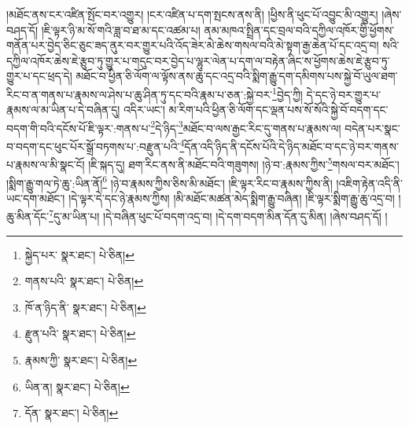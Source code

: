 །མཐོང་ནས་ངར་འཛིན་སྤོང་བར་འགྱུར། །ངར་འཛིན་པ་དག་སྤངས་ནས་ནི། །ཕྱིས་ནི་ཕུང་པོ་འབྱུང་མི་འགྱུར། །ཞེས་བཤད་དོ། །ཇི་ལྟར་ཉི་མ་སོ་གའི་ཟླ་བ་ཐ་མ་དང་འཚམ་པ། ནམ་མཁའ་སྤྲིན་དང་བྲལ་བའི་དཀྱིལ་འཁོར་གྱི་ཕྱོགས་གནོན་པར་བྱེད་ཅིང་ཅུང་ཟད་ནུར་བར་གྱུར་པའི་འོད་ཟེར་མེ་ཆེས་གསལ་བའི་མེ་སྟག་རྒྱ་ཆེན་པོ་དང་འདྲ་བ། སའི་དཀྱིལ་འཁོར་ཆེས་ཇེ་རྩུབ་ཏུ་གྱུར་པ་གདུང་བར་བྱེད་པ་ལྷུར་ལེན་པ་དག་ལ་བརྟེན་ཞིང་ས་ཕྱོགས་ཆེས་ཇེ་རྩུབ་ཏུ་གྱུར་པ་དང་ཕྲད་དེ། མཐོང་བ་ཕྱིན་ཅི་ལོག་ལ་ལྟོས་ནས་ཆུ་དང་འདྲ་བའི་སྨིག་རྒྱུ་དག་དམིགས་པས་སྐྱེ་བོ་ཡུལ་ཐག་རིང་བ་ན་གནས་པ་རྣམས་ལ་ཤེས་པ་ཆུ་ཤིན་ཏུ་དང་བའི་རྣམ་པ་ཅན་:སྐྱེ་བར་\footnote{སྐྱེད་པར་  སྣར་ཐང་།  པེ་ཅིན། }བྱེད་ཀྱི། དེ་དང་ཉེ་བར་གྱུར་པ་རྣམས་ལ་མ་ཡིན་པ་དེ་བཞིན་དུ། འདིར་ཡང་། མ་རིག་པའི་ཕྱིན་ཅི་ལོག་དང་ལྡན་པས་སོ་སོའི་སྐྱེ་བོ་བདག་དང་བདག་གི་བའི་དངོས་པོ་ཇི་ལྟར་:གནས་པ་\footnote{གནས་པའི་  སྣར་ཐང་།  པེ་ཅིན། }དེ་ཉིད་\footnote{ཁོ་ན་ཉིད་ནི་  སྣར་ཐང་།  པེ་ཅིན། }མཐོང་བ་ལས་རྒྱང་རིང་དུ་གནས་པ་རྣམས་ལ། བདེན་པར་སྣང་བ་བདག་དང་ཕུང་པོར་སྒྲོ་བཏགས་པ་:བརྫུན་པའི་\footnote{རྫུན་པའི་  སྣར་ཐང་།  པེ་ཅིན། }དོན་འདི་ཉིད་ནི་དངོས་པོའི་དེ་ཉིད་མཐོང་བ་དང་ཉེ་བར་གནས་པ་རྣམས་ལ་མི་སྣང་ངོ། །ཇི་སྐད་དུ། ཐག་རིང་ནས་ནི་མཐོང་བའི་གཟུགས། །ཉེ་བ་:རྣམས་ཀྱིས་\footnote{རྣམས་ཀྱི་  སྣར་ཐང་།  པེ་ཅིན། }གསལ་བར་མཐོང་། །སྨིག་རྒྱུ་གལ་ཏེ་ཆུ་:ཡིན་ནོ།\footnote{ཡིན་ན།  སྣར་ཐང་།  པེ་ཅིན། } །ཉེ་བ་རྣམས་ཀྱིས་ཅིས་མི་མཐོང་། །ཇི་ལྟར་རིང་བ་རྣམས་ཀྱིས་ནི། །འཇིག་རྟེན་འདི་ནི་ཡང་དག་མཐོང་། །དེ་ལྟར་དེ་དང་ཉེ་རྣམས་ཀྱིས། །མི་མཐོང་མཚན་མེད་སྨིག་རྒྱུ་བཞིན། །ཇི་ལྟར་སྨིག་རྒྱུ་ཆུ་འདྲ་བ། །ཆུ་མིན་དོང་\footnote{དོན་  སྣར་ཐང་།  པེ་ཅིན། }དུ་མ་ཡིན་པ། །དེ་བཞིན་ཕུང་པོ་བདག་འདྲ་བ། །དེ་དག་བདག་མིན་དོན་དུ་མིན། །ཞེས་བཤད་དོ། །
